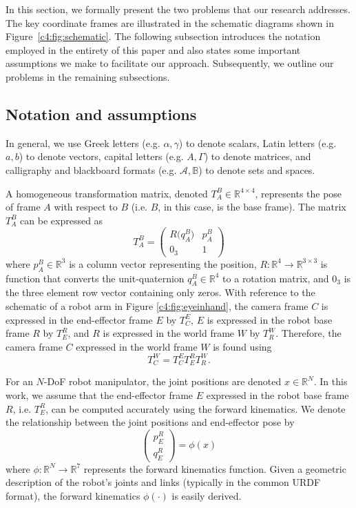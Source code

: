 In this section, we formally present the two problems that our research addresses. 
The key coordinate frames are illustrated in the schematic diagrams shown in Figure~\ref{c4:fig:schematic}. 
The following subsection introduces the notation employed in the entirety of this paper and also states some important assumptions we make to facilitate our approach. 
Subsequently, we outline our problems in the remaining subsections.

\subsection{Notation and assumptions}

In general, we use 
Greek letters (e.g. $\alpha, \gamma$) to denote scalars, 
Latin letters (e.g. $a, b$) to denote vectors, 
capital letters (e.g. $A, \Gamma$) to denote matrices, and 
calligraphy and blackboard formats (e.g. $\mathcal{A}, \mathbb{B}$) to denote sets and spaces.

A homogeneous transformation matrix, denoted $T^B_A\in\mathbb{R}^{4 \times 4}$, represents the pose of frame $A$ with respect to $B$ (i.e. $B$, in this case, is the base frame).
The matrix $T^B_A$ can be expressed as
\[
T^B_A = 
    \left(
    \begin{array}{cc}
     R\big(q^B_A\big) & p^B_A \\
     0_3 & 1
    \end{array}
    \right)
\]
where $p^B_A\in\mathbb{R}^3$ is a column vector representing the position, $R:\mathbb{R}^4\rightarrow\mathbb{R}^{3\times 3}$ is function that converts the unit-quaternion $q^B_A\in\mathbb{R}^4$ to a rotation matrix, and $0_3$ is the three element row vector containing only zeros.
With reference to the schematic of a robot arm in Figure \ref{c4:fig:eyeinhand}, the camera frame $C$ is expressed in the end-effector frame $E$ by $T^E_C$,
$E$ is expressed in the robot base frame $R$ by $T^R_E$, and
$R$ is expressed in the world frame $W$ by $T^W_R$.
Therefore, the camera frame $C$ expressed in the world frame $W$ is found using
\[
T^W_C = T^E_C T^R_E T^W_R.
\]

For an $N$-DoF robot manipulator, the joint positions are denoted $x\in\mathbb{R}^N$.
In this work, we assume that the end-effector frame $E$ expressed in the robot base frame $R$, i.e. $T^R_E$, can be computed accurately using the forward kinematics. 
We denote the relationship between the joint positions and end-effector pose by
\[
\left(
\begin{array}{c}
     p^R_E\\
     q^R_E
\end{array}
\right)
= \phi(x)
\]
where $\phi: \mathbb{R}^N\rightarrow\mathbb{R}^{7}$ represents the forward kinematics function.
Given a geometric description of the robot's joints and links (typically in the common URDF format), the forward kinematics $\phi(\cdot)$ is easily derived.

